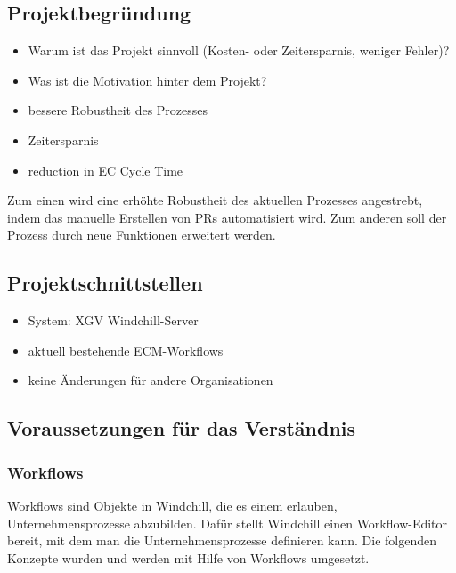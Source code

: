 \subsection{Projektbegründung} 
\label{sec:Projektbegruendung}
\begin{itemize} %
	\item Warum ist das Projekt sinnvoll (\zB Kosten- oder Zeitersparnis, weniger Fehler)?
	\item Was ist die Motivation hinter dem Projekt?
\end{itemize}
\begin{itemize}
	\item bessere Robustheit des Prozesses
	\item Zeitersparnis
	\item reduction in EC Cycle Time
\end{itemize}
Zum einen wird eine erhöhte Robustheit des aktuellen Prozesses angestrebt, indem das manuelle Erstellen von \acp{PR} automatisiert wird.
Zum anderen soll der Prozess durch neue Funktionen erweitert werden.

\subsection{Projektschnittstellen}
\label{sec:Projektschnittstellen}
\begin{itemize}
	\item System: \ac{XGV} Windchill-Server
	\item aktuell bestehende \ac{ECM}-Workflows
	\item keine Änderungen für andere Organisationen
\end{itemize}

\subsection{Voraussetzungen für das Verständnis}
\label{subsec:VerstaendnisVoraussetzungen}

\subsubsection{Workflows}
Workflows sind Objekte in Windchill, die es einem erlauben, Unternehmensprozesse abzubilden.
Dafür stellt Windchill einen Workflow-Editor bereit, mit dem man die Unternehmensprozesse definieren kann.
Die folgenden Konzepte wurden und werden mit Hilfe von Workflows umgesetzt.

